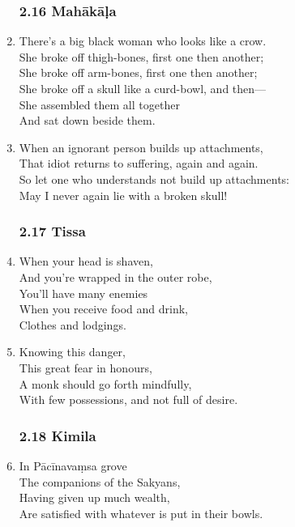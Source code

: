 \documentclass[10pt, openany]{book}
\begin{document}
\begin{enumerate}
\subsubsection*{2.16 Mahākāḷa}

\item There’s a big black woman who looks like a crow.\\
She broke off thigh-bones, first one then another;\\
She broke off arm-bones, first one then another;\\
She broke off a skull like a curd-bowl, and then—\\
She assembled them all together \\
And sat down beside them.

\item When an ignorant person builds up attachments,\\
That idiot returns to suffering, again and again.\\
So let one who understands not build up attachments:\\
May I never again lie with a broken skull!

\subsubsection*{2.17 Tissa}

\item When your head is shaven, \\
And you’re wrapped in the outer robe,\\
You’ll have many enemies\\
When you receive food and drink,\\
Clothes and lodgings.

\item Knowing this danger,\\
This great fear in honours,\\
A monk should go forth mindfully,\\
With few possessions, and not full of desire.

\subsubsection*{2.18 Kimila}

\item In Pācīnavaṃsa grove\\
The companions of the Sakyans,\\
Having given up much wealth,\\
Are satisfied with whatever is put in their bowls.


\end{enumerate}
\end{document}

